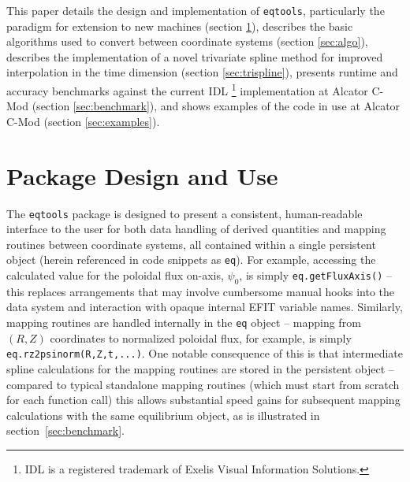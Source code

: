\documentclass[12pt,floatfix,showpacs]{revtex4-1}
\newcommand{\eqtools}{\texttt{eqtools}\xspace}
\begin{document}
This paper details the design and implementation of \eqtools, particularly the paradigm for extension to new machines (section \ref{sec:design}), describes the basic algorithms used to convert between coordinate systems (section \ref{sec:algo}), describes the implementation of a novel trivariate spline method for improved interpolation in the time dimension (section \ref{sec:trispline}), presents runtime and accuracy benchmarks against the current IDL \footnote{IDL is a registered trademark of Exelis Visual Information Solutions.} implementation at Alcator C-Mod (section \ref{sec:benchmark}), and shows examples of the code in use at Alcator C-Mod (section \ref{sec:examples}).

\section{Package Design and Use}\label{sec:design}

The \eqtools package is designed to present a consistent, human-readable interface to the user for both data handling of derived quantities and mapping routines between coordinate systems, all contained within a single persistent object (herein referenced in code snippets as \verb|eq|).
For example, accessing the calculated value for the poloidal flux on-axis, $\psi_0$, is simply \verb|eq.getFluxAxis()| -- this replaces arrangements that may involve cumbersome manual hooks into the data system and interaction with opaque internal EFIT variable names.
Similarly, mapping routines are handled internally in the \verb|eq| object -- mapping from $(R, Z)$ coordinates to normalized poloidal flux, for example, is simply \verb|eq.rz2psinorm(R,Z,t,...)|.  
One notable consequence of this is that intermediate spline calculations for the mapping routines are stored in the persistent object -- compared to typical standalone mapping routines (which must start from scratch for each function call) this allows substantial speed gains for subsequent mapping calculations with the same equilibrium object, as is illustrated in section~\ref{sec:benchmark}.
\end{document}
